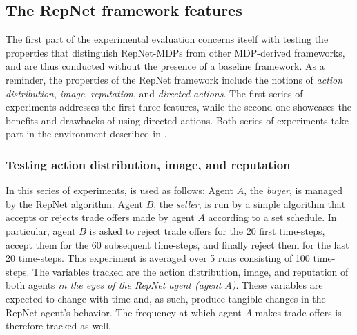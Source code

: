 \subsection{The RepNet framework features}
\label{sub:repfeat}
The first part of the experimental evaluation concerns itself with testing the properties that distinguish RepNet-MDPs from other MDP-derived frameworks, and are thus conducted without the presence of a baseline framework. As a reminder, the properties of the RepNet framework include the notions of \textit{action distribution}, \textit{image}, \textit{reputation}, and \textit{directed actions}. The first series of experiments addresses the first three features, while the second one showcases the benefits and drawbacks of using directed actions. Both series of experiments take part in the environment described in .

\subsubsection{Testing action distribution, image, and reputation}
In this series of experiments,  is used as follows: Agent $A$, the \textit{buyer}, is managed by the RepNet algorithm. Agent $B$, the \textit{seller}, is run by a simple algorithm that accepts or rejects trade offers made by agent $A$ according to a set schedule. In particular, agent $B$ is asked to reject trade offers for the 20 first time-steps, accept them for the 60 subsequent time-steps, and finally reject them for the last 20 time-steps. This experiment is averaged over 5 runs consisting of 100 time-steps. The variables tracked are the action distribution, image, and reputation of both agents \textit{in the eyes of the RepNet agent (agent $A$)}. These variables are expected to change with time and, as such, produce tangible changes in the RepNet agent's behavior. The frequency at which agent $A$ makes trade offers is therefore tracked as well.


